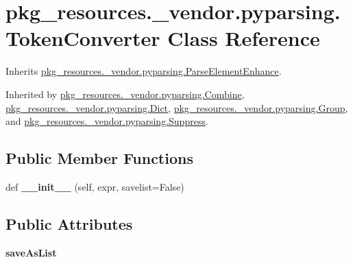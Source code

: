 \hypertarget{classpkg__resources_1_1__vendor_1_1pyparsing_1_1_token_converter}{}\section{pkg\+\_\+resources.\+\_\+vendor.\+pyparsing.\+Token\+Converter Class Reference}
\label{classpkg__resources_1_1__vendor_1_1pyparsing_1_1_token_converter}


Inherits \hyperlink{classpkg__resources_1_1__vendor_1_1pyparsing_1_1_parse_element_enhance}{pkg\+\_\+resources.\+\_\+vendor.\+pyparsing.\+Parse\+Element\+Enhance}.



Inherited by \hyperlink{classpkg__resources_1_1__vendor_1_1pyparsing_1_1_combine}{pkg\+\_\+resources.\+\_\+vendor.\+pyparsing.\+Combine}, \hyperlink{classpkg__resources_1_1__vendor_1_1pyparsing_1_1_dict}{pkg\+\_\+resources.\+\_\+vendor.\+pyparsing.\+Dict}, \hyperlink{classpkg__resources_1_1__vendor_1_1pyparsing_1_1_group}{pkg\+\_\+resources.\+\_\+vendor.\+pyparsing.\+Group}, and \hyperlink{classpkg__resources_1_1__vendor_1_1pyparsing_1_1_suppress}{pkg\+\_\+resources.\+\_\+vendor.\+pyparsing.\+Suppress}.

\subsection*{Public Member Functions}
\begin{DoxyCompactItemize}
\item 
\mbox{\label{classpkg__resources_1_1__vendor_1_1pyparsing_1_1_token_converter_a4b46a8ef46f5cdc2e6f02d1877c9b7d1}} 
def {\bfseries \+\_\+\+\_\+init\+\_\+\+\_\+} (self, expr, savelist=False)
\end{DoxyCompactItemize}
\subsection*{Public Attributes}
\begin{DoxyCompactItemize}
\item 
\mbox{\label{classpkg__resources_1_1__vendor_1_1pyparsing_1_1_token_converter_aed35ce39b8a906800783a8b10c702363}} 
{\bfseries save\+As\+List}
\end{DoxyCompactItemize}
